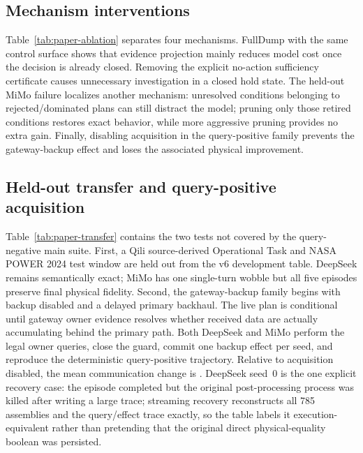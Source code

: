 \documentclass[journal,10pt]{IEEEtran}
\begin{document}
\subsection{Mechanism interventions}
Table~\ref{tab:paper-ablation} separates four mechanisms. FullDump with the same control surface
shows that evidence projection mainly reduces model cost once the decision is already closed.
Removing the explicit no-action sufficiency certificate causes unnecessary investigation in a
closed hold state. The held-out MiMo failure localizes another mechanism: unresolved conditions
belonging to rejected/dominated plans can still distract the model; pruning only those retired
conditions restores exact behavior, while more aggressive pruning provides no extra gain. Finally,
disabling acquisition in the query-positive family prevents the gateway-backup effect and loses
the associated physical improvement.
\begin{table}[t]
\centering\small
\caption{Mechanism interventions; each row changes the stated interface component while keeping
its paired runtime/physical coordinate fixed.}
\label{tab:paper-ablation}
\resizebox{\columnwidth}{!}{}
\end{table}

\subsection{Held-out transfer and query-positive acquisition}
Table~\ref{tab:paper-transfer} contains the two tests not covered by the query-negative main
suite. First, a Qili source-derived Operational Task and NASA POWER 2024 test window are held out
from the v6 development table. DeepSeek remains semantically exact; MiMo has one single-turn wobble
but all five episodes preserve final physical fidelity. Second, the gateway-backup family begins
with backup disabled and a delayed primary backhaul. The live plan is conditional until gateway
owner evidence resolves whether received data are actually accumulating behind the primary path.
Both DeepSeek and MiMo perform the legal owner queries, close the guard, commit one backup effect
per seed, and reproduce the deterministic query-positive trajectory. Relative to acquisition
disabled, the mean communication change is \AgenticQPGain{}. DeepSeek seed~0 is the one explicit
recovery case: the episode completed but the original post-processing process was killed after
writing a large trace; streaming recovery reconstructs all 785 assemblies and the query/effect
trace exactly, so the table labels it execution-equivalent rather than pretending that the
original direct physical-equality boolean was persisted.
\begin{table}[t]
\centering\small
\caption{Held-out task/source/model transfer and the query-positive gateway-backup family.}
\label{tab:paper-transfer}
\resizebox{\textwidth}{!}{}
\end{table}
\end{document}
